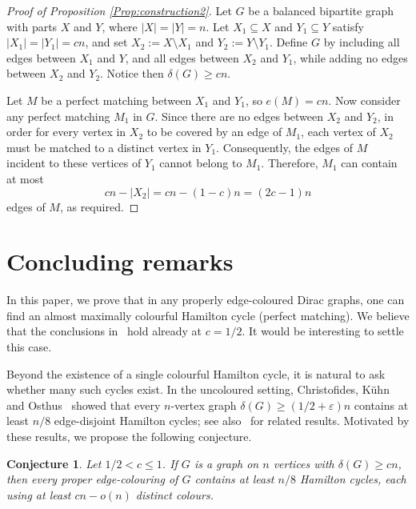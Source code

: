\documentclass[11pt,reqno]{amsart}
\newtheorem{conjecture}[theorem]{Conjecture}
\theoremstyle{definition}
\theoremstyle{remark}
\renewcommand\geq{\geqslant}
\renewcommand\le{\leqslant}
\renewcommand\ge{\geqslant}
\begin{document}



\begin{proof}[Proof of Proposition \ref{Prop:construction2}]
Let $G$ be a balanced bipartite graph with parts $X$ and $Y$, where $|X|=|Y|=n$. Let $X_1 \subseteq X$ and $Y_1 \subseteq Y$ satisfy $|X_1|=|Y_1|=cn$, and set $X_2 := X \setminus X_1$ and $Y_2 := Y \setminus Y_1$. 
Define $G$ by including all edges between $X_1$ and $Y$, and all edges between $X_2$ and $Y_1$, while adding no edges between $X_2$ and $Y_2$. Notice then $\delta(G) \ge cn$.

Let $M$ be a perfect matching between $X_1$ and $Y_1$, so $e(M)=cn$. Now consider any perfect matching $M_1$ in $G$. 
Since there are no edges between $X_2$ and $Y_2$, in order for every vertex in $X_2$ to be covered by an edge of $M_1$, each vertex of $X_2$ must be matched to a distinct vertex in $Y_1$. Consequently, the edges of $M$ incident to these vertices of $Y_1$ cannot belong to $M_1$. Therefore, $M_1$ can contain at most
\[
cn-|X_2| = cn-(1-c)n = (2c-1)n
\]
edges of $M$, as required.
\end{proof}


\medskip


\section{Concluding remarks}\label{sec:conclusion}
In this paper, we prove that in any properly edge-coloured Dirac graphs, one can find an almost maximally colourful Hamilton cycle (perfect matching). We believe that the conclusions in~ hold already at $c=1/2$. It would be interesting to settle this case.


Beyond the existence of a single colourful Hamilton cycle, it is natural to ask whether many such cycles exist. In the uncoloured setting, Christofides, K\"uhn and Osthus~\cite{CKO} showed that every $n$-vertex graph $\delta(G)\geq(1/2+\varepsilon)n$ contains at least $n/8$ edge-disjoint Hamilton cycles; see also~\cite{MPS2019,KKKO} for related results. Motivated by these results, we propose the following conjecture.


\begin{conjecture}
Let $1/2<c\le1$. If $G$ is a graph on $n$ vertices with $\delta(G)\ge cn$, then every proper edge-colouring of $G$ contains at least $n/8$ Hamilton cycles, each using at least $cn-o(n)$ distinct colours.
\end{conjecture}
\end{document}
